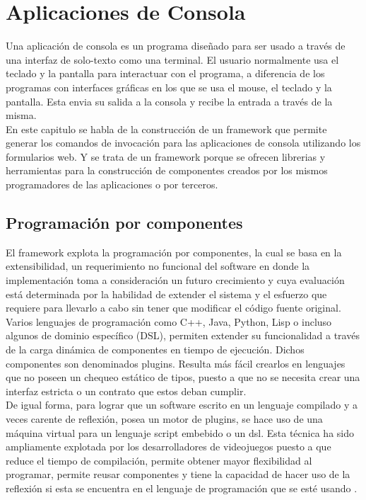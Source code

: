 \section{Aplicaciones de Consola}
Una aplicación de consola es un programa diseñado para ser usado a través de una interfaz de solo-texto como una terminal. El usuario normalmente usa el teclado y la pantalla para interactuar con el programa, a diferencia de los programas con interfaces gráficas en los que se usa el mouse, el teclado y la pantalla. Esta envia su salida a la consola y recibe la entrada a través de la misma.\\

En este capitulo se habla de la construcción de un framework que permite generar los comandos de invocación para las aplicaciones de consola utilizando los formularios web. Y se trata de un framework porque se ofrecen librerias y herramientas para la construcción de componentes creados por los mismos programadores de las aplicaciones o por terceros.

\subsection{Programación por componentes}
El framework explota la programación por componentes, la cual se basa en la extensibilidad, un requerimiento no funcional del software en donde la implementación toma a consideración un futuro crecimiento y cuya evaluación está determinada por la habilidad de extender el sistema y el esfuerzo que requiere para llevarlo a cabo sin tener que modificar el código fuente original. \\

Varios lenguajes de programación como C++, Java, Python, Lisp o incluso algunos de dominio específico (DSL), permiten extender su funcionalidad a través de la carga dinámica de componentes en tiempo de ejecución. Dichos componentes son denominados plugins. Resulta más fácil crearlos en lenguajes que no poseen un chequeo estático de tipos, puesto a que no se necesita crear una interfaz estricta o un contrato que estos deban cumplir.\\

De igual forma, para lograr que un software escrito en un lenguaje compilado y a veces carente de reflexión, posea un motor de plugins, se hace uso de una máquina virtual para un lenguaje script embebido o un dsl. Esta técnica ha sido ampliamente explotada por los desarrolladores de videojuegos puesto a que reduce el tiempo de compilación, permite obtener mayor flexibilidad al programar, permite reusar componentes y tiene la capacidad de hacer uso de la reflexión si esta se encuentra en el lenguaje de programación que se esté usando \cite{LuaWhereUsed} \cite{LuaUses}.\\

